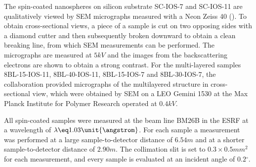 \documentclass[\main/dresen_thesis.tex]{subfiles}
\begin{document}
    The spin-coated nanospheres on silicon substrate SC-IOS-7 and SC-IOS-11 are qualitatively viewed by SEM micrographs measured with a Neon Zeiss 40 ().
    To obtain cross-sectional views, a piece of a sample is cut on two opposing sides with a diamond cutter and then subsequently broken downward to obtain a clean breaking line, from which SEM measurements can be performed.
    The micrographs are measured at $5 \unit{kV}$ and the images from the backscattering electrons are shown to obtain a strong contrast.
    For the multi-layered samples 8BL-15-IOS-11, 8BL-40-IOS-11, 8BL-15-IOS-7 and 8BL-30-IOS-7, the collaboration provided micrographs of the multilayered structure in cross-sectional view, which were obtained by SEM on a LEO Gemini 1530 at the Max Planck Institute for Polymer Research operated at $0.4 \unit{kV}$.

    All spin-coated samples were measured at the beam line BM26B  in the ESRF at a wavelength of $\lambda \eq 1.03 \unit{\angstrom}$.
    For each sample a measurement was performed at a large sample-to-detector distance of $6.54 \unit{m}$ and at a shorter sample-to-detector distance of $2.90 \unit{m}$.
    The collimation slit is set to $0.3 \times 0.5 \unit{mm^2}$ for each measurement, and every sample is evaluated at an incident angle of $0.2 \unit{^\circ}$.
\end{document}
